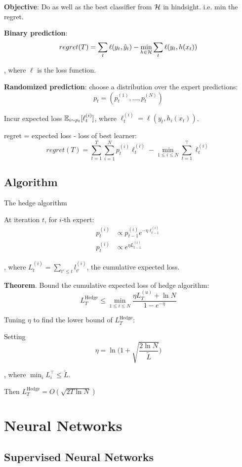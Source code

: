 \documentclass[a4paper]{report}
\begin{document}
\textbf{Objective}: Do as well as the best classifier from $\mathcal{H}$ in hindsight. i.e. min the regret. 

\textbf{Binary prediction}:
$$
regret(T) = \sum_t \ell(y_t, \hat y_t) - \min_{h\in \mathcal{H}} \sum_t \ell(y_t, h(x_t))
$$

, where $\ell$ is the loss function. 

\textbf{Randomized prediction}: choose a distribution over the expert predictions: $$
p_t = (p_t^{(1)},...,p_t^{(N)})
$$

Incur expected loss $\mathbb{E}_{i\sim p_t}[\ell_t^{(i)}]$, where $\ell_t^{(i)}=\ell(y_t, h_i(x_t))$.

regret = expected loss - loss of best learner: 
$$
regret(T) = \sum_{t=1}^T \sum_{i=1}^N p_t^{(i)}\ell_t^{(i)} - \min_{1\leq i \leq N}\sum_{t=1}^\top\ell_t^{(i)}
$$

\section{Algorithm}
The hedge algorithm

At iteration $t$, for $i$-th expert:
\begin{align*}
p_t^{(i)} &\propto p_{t-1}^{(i)} e^{-\eta \ell_{t-1}^{(i)}} \\
p_t^{(i)} &\propto e^{\eta L_{t-1}^{(i)}}
\end{align*}

, where $L^{(i)}_t = \sum_{t'\leq t} l^{(i)}_{t'}$, the cumulative expected loss. 

\textbf{Theorem}. Bound the cumulative expected loss of hedge algorithm:
$$
L^\text{Hedge}_T\leq \min_{1\leq i \leq N} \frac{\eta L^{(u)}_T+\ln N}{1-e^{-\eta}}
$$

Tuning $\eta$ to find the lower bound of $L^\text{Hedge}_T$:

Setting 
$$
\eta = \ln \Bigg(1+\sqrt{\frac{2\ln N}{\tilde L}}\Bigg)
$$

, where $\min_i L_i^\top \leq \tilde L $. 

Then $L_T^\text{Hedge}=O(\sqrt{2T\ln N})$

\chapter{Neural Networks}

\section{Supervised Neural Networks}
\end{document}
